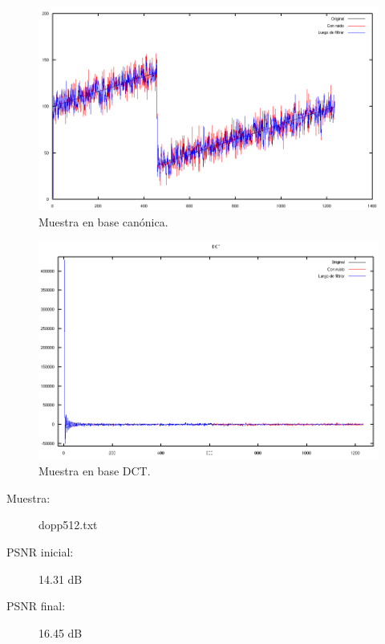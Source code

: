\documentclass[a4paper,10pt,twoside]{article}
\begin{document}
\begin{figure}[H]
  \centering
  \includegraphics[width=15cm]{graficos/ramp_aditivo_umbralizar_muestra.png}
  \caption{Muestra en base canónica.}
\end{figure}

\begin{figure}[H]
  \centering
  \includegraphics[width=15cm]{graficos/ramp_aditivo_umbralizar_dct.png} 
  \caption{Muestra en base DCT.}
\end{figure}


\begin{description}
  \item[Muestra:] dopp512.txt
  \item[PSNR inicial:] 14.31 dB
  \item[PSNR final:] 16.45 dB
\end{description}
\end{document}
